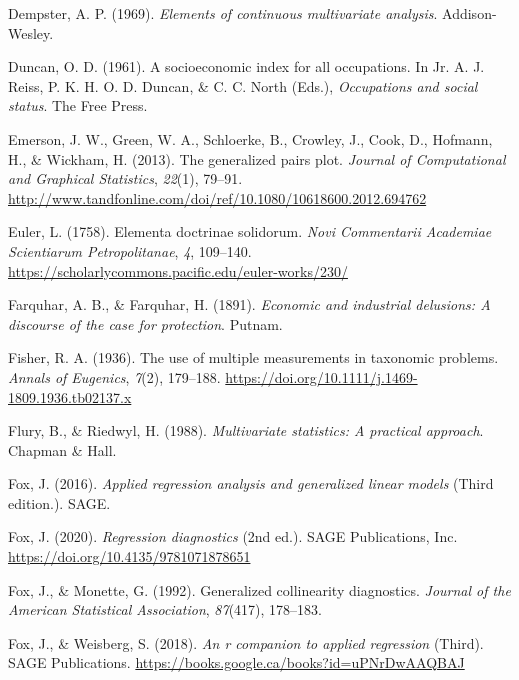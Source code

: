 \documentclass[
  letterpaper,
  10pt,
  krantz2]{krantz}
\newlength{\cslhangindent}
\newlength{\cslentryspacingunit} %
\newenvironment{CSLReferences}[2] %
 {%
  \setlength{\parindent}{0pt}
  \ifodd #1
  \let\oldpar\par
  \def\par{\hangindent=\cslhangindent\oldpar}
  \fi
  \setlength{\parskip}{#2\cslentryspacingunit}
 }%
 {}
\begin{document}
\begin{CSLReferences}{1}{0}
\leavevmode{}%
Dempster, A. P. (1969). \emph{Elements of continuous multivariate
analysis}. Addison-Wesley.

\leavevmode{}%
Duncan, O. D. (1961). A socioeconomic index for all occupations. In Jr.
A. J. Reiss, P. K. H. O. D. Duncan, \& C. C. North (Eds.),
\emph{Occupations and social status}. The Free Press.

\leavevmode{}%
Emerson, J. W., Green, W. A., Schloerke, B., Crowley, J., Cook, D.,
Hofmann, H., \& Wickham, H. (2013). The generalized pairs plot.
\emph{Journal of Computational and Graphical Statistics}, \emph{22}(1),
79--91.
\url{http://www.tandfonline.com/doi/ref/10.1080/10618600.2012.694762}

\leavevmode{}%
Euler, L. (1758). Elementa doctrinae solidorum. \emph{Novi Commentarii
Academiae Scientiarum Petropolitanae}, \emph{4}, 109--140.
\url{https://scholarlycommons.pacific.edu/euler-works/230/}

\leavevmode{}%
Farquhar, A. B., \& Farquhar, H. (1891). \emph{Economic and industrial
delusions: A discourse of the case for protection}. Putnam.

\leavevmode{}%
Fisher, R. A. (1936). The use of multiple measurements in taxonomic
problems. \emph{Annals of Eugenics}, \emph{7}(2), 179--188.
\url{https://doi.org/10.1111/j.1469-1809.1936.tb02137.x}

\leavevmode{}%
Flury, B., \& Riedwyl, H. (1988). \emph{Multivariate statistics: A
practical approach}. Chapman \& Hall.

\leavevmode{}%
Fox, J. (2016). \emph{Applied regression analysis and generalized linear
models} (Third edition.). SAGE.

\leavevmode{}%
Fox, J. (2020). \emph{Regression diagnostics} (2nd ed.). {SAGE}
Publications, Inc. \url{https://doi.org/10.4135/9781071878651}

\leavevmode{}%
Fox, J., \& Monette, G. (1992). Generalized collinearity diagnostics.
\emph{Journal of the American Statistical Association}, \emph{87}(417),
178--183.

\leavevmode{}%
Fox, J., \& Weisberg, S. (2018). \emph{An r companion to applied
regression} (Third). SAGE Publications.
\url{https://books.google.ca/books?id=uPNrDwAAQBAJ}


\end{CSLReferences}
\end{document}

